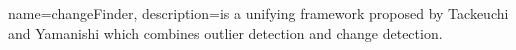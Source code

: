 {
  name=changeFinder,
  description={is a unifying framework proposed by Tackeuchi and Yamanishi \cite{takeuchi2006unifying} which combines outlier detection and change detection.}
}